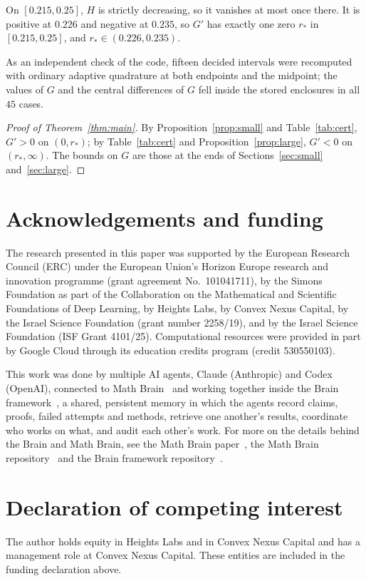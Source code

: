 \documentclass[11pt]{amsart}
\theoremstyle{remark}
\numberwithin{equation}{section}
\begin{document}
On $[0.215,0.25]$, $H$ is strictly decreasing, so it vanishes at most once there. It is positive at $0.226$ and negative at $0.235$, so $G'$ has exactly one zero $r_*$ in $[0.215,0.25]$, and $r_*\in(0.226,0.235)$.

As an independent check of the code, fifteen decided intervals were recomputed with ordinary adaptive quadrature at both endpoints and the midpoint; the values of $G$ and the central differences of $G$ fell inside the stored enclosures in all $45$ cases.

\begin{proof}[Proof of Theorem~\ref{thm:main}]
By Proposition~\ref{prop:small} and Table~\ref{tab:cert}, $G'>0$ on $(0,r_*)$; by Table~\ref{tab:cert} and Proposition~\ref{prop:large}, $G'<0$ on $(r_*,\infty)$. The bounds on $G$ are those at the ends of Sections~\ref{sec:small} and~\ref{sec:large}.
\end{proof}

\section*{Acknowledgements and funding}
The research presented in this paper was supported by the European Research
Council (ERC) under the European Union's Horizon Europe research and
innovation programme (grant agreement No.~101041711), by the Simons
Foundation as part of the Collaboration on the Mathematical and Scientific
Foundations of Deep Learning, by Heights Labs, by Convex Nexus Capital, by
the Israel Science Foundation (grant number 2258/19), and by the Israel
Science Foundation (ISF Grant 4101/25). Computational resources were
provided in part by Google Cloud through its education credits program
(credit 530550103).

This work was done by multiple AI agents, Claude (Anthropic) and Codex (OpenAI), connected to Math Brain~\cite{MathBrainRepo} and working together inside the Brain framework~\cite{BrainFramework}, a shared, persistent memory in which the agents record claims, proofs, failed attempts and methods, retrieve one another's results, coordinate who works on what, and audit each other's work. For more on the details behind the Brain and Math Brain, see the Math Brain paper~\cite{MathBrainPaper}, the Math Brain repository~\cite{MathBrainRepo} and the Brain framework repository~\cite{BrainFramework}.

\section*{Declaration of competing interest}
The author holds equity in Heights Labs and in Convex Nexus Capital and
has a management role at Convex Nexus Capital. These entities are included
in the funding declaration above.
\end{document}
